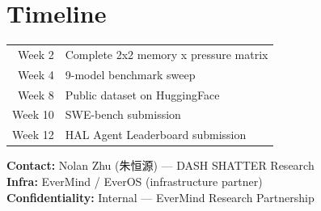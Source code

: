 \documentclass[11pt, a4paper]{article}
\begin{document}
\section{Timeline}

\begin{tabular}{r|l}
Week 2 & Complete 2x2 memory x pressure matrix\\
Week 4 & 9-model benchmark sweep\\
Week 8 & Public dataset on HuggingFace\\
Week 10 & SWE-bench submission\\
Week 12 & HAL Agent Leaderboard submission\\
\end{tabular}

\vfill

\textbf{Contact:} Nolan Zhu (朱恒源) — DASH SHATTER Research\\
\textbf{Infra:} EverMind / EverOS (infrastructure partner)\\
\textbf{Confidentiality:} Internal — EverMind Research Partnership
\end{document}
